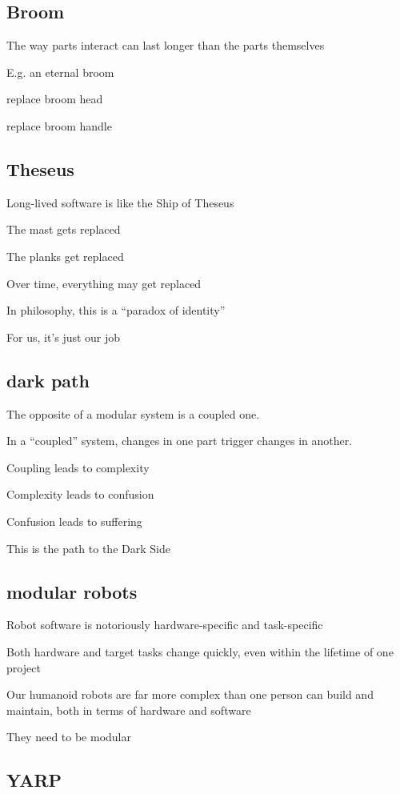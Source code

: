\subsection{Broom}

The way parts interact can last longer than the parts themselves

E.g. an eternal broom

replace broom head

replace broom handle


\subsection{Theseus}

Long-lived software is like the Ship of Theseus

The mast gets replaced

The planks get replaced

Over time, everything may get replaced

In philosophy, this is a ``paradox of identity''

For us, it's just our job


\subsection{dark path}

The opposite of a modular system is a coupled one.

In a ``coupled'' system, changes in one part trigger changes in another.

Coupling leads to complexity

Complexity leads to confusion

Confusion leads to suffering

This is the path to the Dark Side

\subsection{modular robots}

Robot software is notoriously hardware-specific and task-specific

Both hardware and target tasks change quickly, even within the
lifetime of one project

Our humanoid robots are far more complex than one person can build and
maintain, both in terms of hardware and software

They need to be modular


\subsection{YARP}

